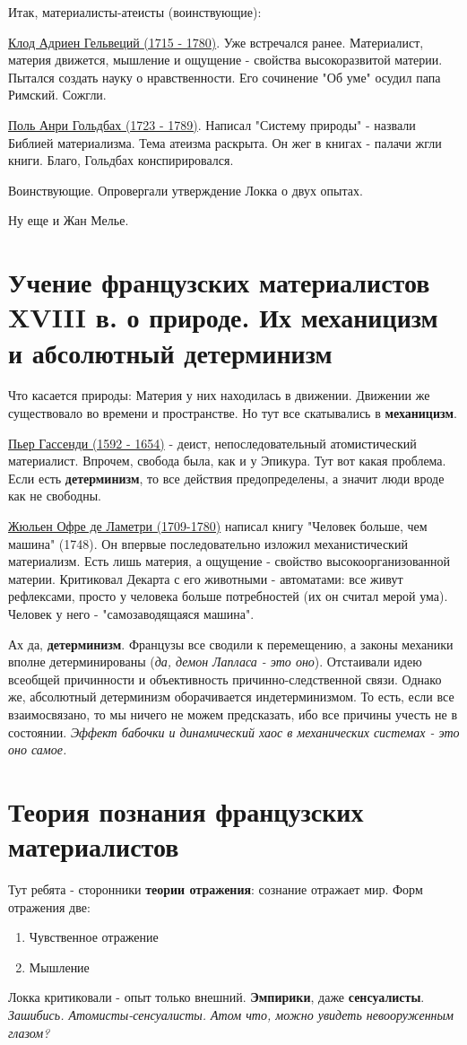 Итак, материалисты-атеисты (воинствующие):

\underline{Клод Адриен Гельвеций (1715 - 1780)}. Уже встречался ранее. Материалист, материя движется, мышление и ощущение - свойства высокоразвитой материи. Пытался создать науку о нравственности. Его сочинение "Об уме" осудил папа Римский. Сожгли.

\underline{Поль Анри Гольдбах (1723 - 1789)}. Написал "Систему природы" - назвали Библией материализма. Тема атеизма раскрыта. Он жег в книгах - палачи жгли книги. Благо, Гольдбах конспирировался.

Воинствующие. Опровергали утверждение Локка о двух опытах. 

Ну еще и Жан Мелье.

\section{Учение французских материалистов XVIII в. о природе. Их механицизм и абсолютный детерминизм}
Что касается природы: Материя у них находилась в движении. Движении же существовало во времени и пространстве. Но тут все скатывались в \textbf{механицизм}.

\underline{Пьер Гассенди (1592 - 1654)} - деист, непоследовательный атомистический материалист. Впрочем, свобода была, как и у Эпикура. Тут вот какая проблема. Если есть \textbf{детерминизм}, то все действия предопределены, а значит люди вроде как не свободны. 

\underline{Жюльен Офре де Ламетри (1709-1780)} написал книгу "Человек больше, чем машина" (1748). Он впервые последовательно изложил механистический материализм. Есть лишь материя, а ощущение - свойство высокоорганизованной материи. Критиковал Декарта с его животными - автоматами: все живут рефлексами, просто у человека больше потребностей (их он считал мерой ума). Человек у него - "самозаводящаяся машина".

Ах да, \textbf{детерминизм}. Французы все сводили к перемещению, а законы механики вполне детерминированы (\textit{да, демон Лапласа - это оно}). Отстаивали идею всеобщей причинности и объективность причинно-следственной связи. Однако же, абсолютный детерминизм оборачивается индетерминизмом. То есть, если все взаимосвязано, то мы ничего не можем предсказать, ибо все причины учесть не в состоянии. \textit{Эффект бабочки и динамический хаос в механических системах - это оно самое. }

\section{Теория познания французских материалистов}
Тут ребята - сторонники \textbf{теории отражения}: сознание отражает мир. Форм отражения две:
\begin{enumerate}
\item Чувственное отражение
\item Мышление
\end{enumerate}
Локка критиковали - опыт только внешний. \textbf{Эмпирики}, даже \textbf{сенсуалисты}. \textit{Зашибись. Атомисты-сенсуалисты. Атом что, можно увидеть невооруженным глазом?}

